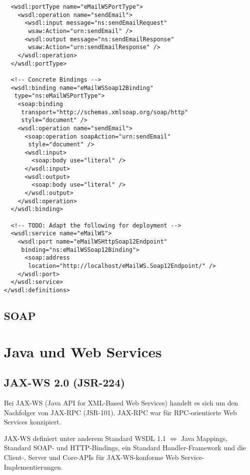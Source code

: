 \documentclass[runningheads]{llncs}
\begin{document}
\begin{verbatim}
  <wsdl:portType name="eMailWSPortType">
    <wsdl:operation name="sendEmail">
      <wsdl:input message="ns:sendEmailRequest"
       wsaw:Action="urn:sendEmail" />
      <wsdl:output message="ns:sendEmailResponse"
       wsaw:Action="urn:sendEmailResponse" />
    </wsdl:operation>
  </wsdl:portType>

  <!-- Concrete Bindings -->
  <wsdl:binding name="eMailWSSoap12Binding"
   type="ns:eMailWSPortType">
    <soap:binding
     transport="http://schemas.xmlsoap.org/soap/http"
     style="document" />
    <wsdl:operation name="sendEmail">
      <soap:operation soapAction="urn:sendEmail"
       style="document" />
      <wsdl:input>
        <soap:body use="literal" />
      </wsdl:input>
      <wsdl:output>
        <soap:body use="literal" />
      </wsdl:output>
    </wsdl:operation>
  </wsdl:binding>

  <!-- TODO: Adapt the following for deployment -->
  <wsdl:service name="eMailWS">
    <wsdl:port name="eMailWSHttpSoap12Endpoint"
     binding="ns:eMailWSSoap12Binding">
      <soap:address
       location="http://localhost/eMailWS.Soap12Endpoint/" />
    </wsdl:port>
  </wsdl:service>
</wsdl:definitions>
    \end{verbatim}

  \label{soap}
  \subsection{SOAP}
  \nocite{wk_soap}

  \label{wsj}
  \section{Java und Web Services}

  \label{jsr224}
  \subsection{JAX-WS 2.0 (JSR-224)}
    Bei JAX-WS\cite{jsr_224} (Java API for XML-Based Web Services) handelt es sich um den Nachfolger von JAX-RPC (JSR-101). JAX-RPC war für RPC-orientierte Web Services konzipiert.

    JAX-WS definiert unter anderem Standard WSDL 1.1 $\Leftrightarrow$ Java Mappings, Standard SOAP- und HTTP-Bindings, ein Standard Handler-Framework und die Client-, Server und Core-APIs für JAX-WS-konforme Web Service-Im\-ple\-men\-tier\-ung\-en.
\end{document}
